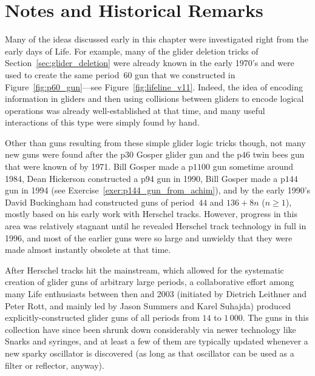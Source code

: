 \section*{Notes and Historical Remarks}

Many of the ideas discussed early in this chapter were investigated right from the early days of Life. For example, many of the glider deletion tricks of Section~\ref{sec:glider_deletion} were already known in the early 1970's and were used to create the same period~$60$ gun that we constructed in Figure~\ref{fig:p60_gun}---see Figure~\ref{fig:lifeline_v11}. Indeed, the idea of encoding information in gliders and then using collisions between gliders to encode logical operations was already well-established at that time, and many useful interactions of this type were simply found by hand.

Other than guns resulting from these simple glider logic tricks though, not many new guns were found after the p$30$ Gosper glider gun and the p$46$ twin bees gun that were known of by 1971. Bill Gosper made a p$1100$ gun sometime around 1984, Dean Hickerson constructed a p$94$ gun in 1990, Bill Gosper made a p$144$ gun in 1994 (see Exercise~\ref{exer:p144_gun_from_achim}), and by the early 1990's David Buckingham had constructed guns of period~$44$ and $136+8n$ ($n \geq 1$), mostly based on his early work with Herschel tracks. However, progress in this area was relatively stagnant until he revealed Herschel track technology in full in 1996, and most of the earlier guns were so large and unwieldy that they were made almost instantly obsolete at that time.

After Herschel tracks hit the mainstream, which allowed for the systematic creation of glider guns of arbitrary large periods, a collaborative effort among many Life enthusiasts between then and 2003 (initiated by Dietrich Leithner and Peter Rott, and mainly led by Jason Summers and Karel Suhajda) produced explicitly-constructed glider guns of all periods from $14$ to $1\, 000$. The guns in this collection have since been shrunk down considerably via newer technology like Snarks and syringes, and at least a few of them are typically updated whenever a new sparky oscillator is discovered (as long as that oscillator can be used as a filter or reflector, anyway).

